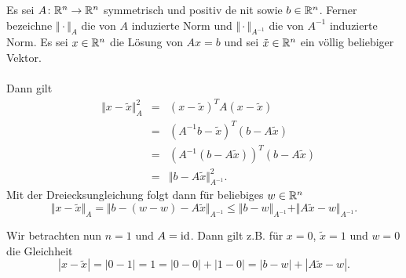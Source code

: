 
Es sei $A\colon \mathbb{R}^n\to\mathbb{R}^n$ symmetrisch und positiv de nit sowie $b\in\mathbb{R}^n$.
Ferner bezeichne $\Vert\cdot\Vert_A$ die von $A$ induzierte Norm und
$\Vert\cdot\Vert_{A^{-1}}$ die von $A^{-1}$ induzierte Norm. Es sei $x\in\mathbb{R}^n$
die Lösung von $Ax=b$ und sei $\tilde x\in\mathbb{R}^n$ ein völlig beliebiger Vektor.
\\ \\
Dann gilt
\begin{align*}
 &\Vert x-\tilde x \Vert_A^2 &=&(x-\tilde x)^TA(x-\tilde x)\\&&=&(A^{-1}b-\tilde x)^T(b-A\tilde x)\\
 &&=&(A^{-1}(b-A\tilde x))^T(b-A\tilde x)\\&&=&\Vert b-A\tilde x\Vert_{A^{-1}}^2.
\end{align*}
Mit der Dreiecksungleichung folgt dann für beliebiges $w\in\mathbb{R}^n$
\begin{displaymath}
 \Vert x-\tilde x \Vert_A=\Vert b-(w-w)-A\tilde x\Vert_{A^{-1}}\leq \Vert b-w\Vert_{A^{-1}}+\Vert A\tilde x-w\Vert_{A^{-1}}.
\end{displaymath}

Wir betrachten nun $n=1$ und $A=\operatorname{id}$. Dann gilt z.B. für $x=0$, $\tilde x=1$ und $w=0$ die Gleichheit
\begin{displaymath}
 |x-\tilde x|=|0-1|=1=|0-0|+|1-0|=|b-w|+|A\tilde x-w|.
\end{displaymath}

